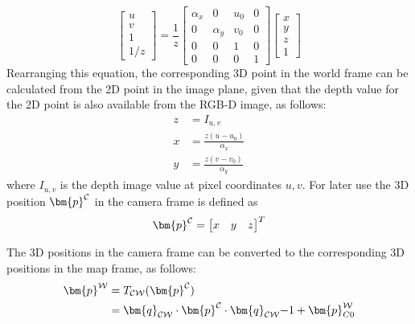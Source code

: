         \begin{equation} \label{eq:local_projection}
            \begin{bmatrix}
                u \\
                v \\
                1 \\
                1/z
            \end{bmatrix}
            = \frac{1}{z}
            \begin{bmatrix}
                \alpha_x & 0 & u_0 & 0 \\
                0 & \alpha_y & v_0 & 0 \\
                0 & 0 & 1 & 0 \\
                0 & 0 & 0 & 1
            \end{bmatrix}
            \begin{bmatrix}
                x\\
                y\\
                z\\
                1
            \end{bmatrix}
        \end{equation}
        Rearranging this equation, the corresponding 3D point in the world frame can be calculated from the 2D point in the image plane, given that the depth value for the 2D point is also available from the RGB-D image, as follows:
        \begin{align}
            z &= I_{u,v} \label{eq:proj_z}\\[0.2cm]
            x &= \frac{z(u - u_0)}{\alpha_x}\label{eq:proj_x} \\
            y &= \frac{z(v - v_0)}{\alpha_y}\label{eq:proj_y}
        \end{align}
        where \(I_{u,v}\) is the depth image value at pixel coordinates \(u,v\). For later use the 3D position \(\bm{p} \inrefframe{C}\) in the camera frame is defined as
        \begin{equation}\label{eq:pcam}
            \bm{p}\inrefframe{C}=
            \begin{bmatrix}
                x &y &z
            \end{bmatrix}^T
        \end{equation}

        \noindent
        The 3D positions in the camera frame can be converted to the corresponding 3D positions in the map frame, as follows:
        \begin{align} \label{eq:camera_to_map}
            \begin{split}
                \bm{p}\inrefframe{\fworld} &= \transframe{\bm{p}\inrefframe{\fcamera}}{\fcamera}{\fworld}\\ 
                &= \bm{q}_{\fcamera\fworld} \cdot \bm{p}\inrefframe{\fcamera} \cdot \bm{q}_{\fcamera\fworld}{-1} + \bm{p}\inrefframe{\fworld}_{C0}
            \end{split}
        \end{align}

